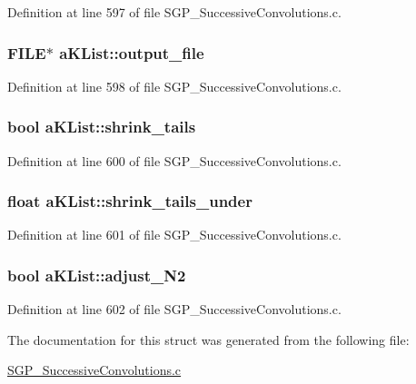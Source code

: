 Definition at line 597 of file SGP\_\-SuccessiveConvolutions.c.\hypertarget{structaKList_7289c72fcd7a2467cb8373931dcc472c}{
\subsubsection[output\_\-file]{\setlength{\rightskip}{0pt plus 5cm}FILE$\ast$ {\bf aKList::output\_\-file}}}
\label{d8/d05/structaKList_7289c72fcd7a2467cb8373931dcc472c}




Definition at line 598 of file SGP\_\-SuccessiveConvolutions.c.\hypertarget{structaKList_977b4034a6e9defc5825ba330d44dc9e}{
\subsubsection[shrink\_\-tails]{\setlength{\rightskip}{0pt plus 5cm}bool {\bf aKList::shrink\_\-tails}}}
\label{d8/d05/structaKList_977b4034a6e9defc5825ba330d44dc9e}




Definition at line 600 of file SGP\_\-SuccessiveConvolutions.c.\hypertarget{structaKList_62a6d997bd82869956bf9beb022716fc}{
\subsubsection[shrink\_\-tails\_\-under]{\setlength{\rightskip}{0pt plus 5cm}float {\bf aKList::shrink\_\-tails\_\-under}}}
\label{d8/d05/structaKList_62a6d997bd82869956bf9beb022716fc}




Definition at line 601 of file SGP\_\-SuccessiveConvolutions.c.\hypertarget{structaKList_e399b9793e914c910828efdcb30ba8ec}{
\subsubsection[adjust\_\-N2]{\setlength{\rightskip}{0pt plus 5cm}bool {\bf aKList::adjust\_\-N2}}}
\label{d8/d05/structaKList_e399b9793e914c910828efdcb30ba8ec}




Definition at line 602 of file SGP\_\-SuccessiveConvolutions.c.

The documentation for this struct was generated from the following file:\begin{CompactItemize}
\item 
\hyperlink{SGP__SuccessiveConvolutions_8c}{SGP\_\-SuccessiveConvolutions.c}\end{CompactItemize}
